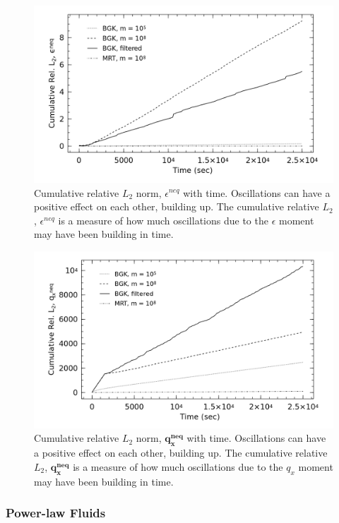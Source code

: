\begin{figure}
    \includegraphics[width=\linewidth]{figs/poise-bingham/epsilon_cumulative}
    \caption{Cumulative relative $L_2$ norm, $\epsilon^{neq}$ with time. Oscillations can have a positive effect on each other, building up. The cumulative relative $L_2$, $\epsilon^{neq}$ is a measure of how much oscillations due to the $\epsilon$ moment may have been building in time.}
    \label{fig:epsilon-cumulative}
\end{figure}

\begin{figure}
    \includegraphics[width=\linewidth]{figs/poise-bingham/qx_cumulative}
    \caption{Cumulative relative $L_2$ norm, $\mathbf{q_x^{neq}}$ with time. Oscillations can have a positive effect on each other, building up. The cumulative relative $L_2$, $\mathbf{q_x^{neq}}$ is a measure of how much oscillations due to the $q_x$ moment may have been building in time.}
    \label{fig:qx-cumulative}
\end{figure}

\subsubsection{Power-law Fluids} \label{sec:poise-powerlaw}


